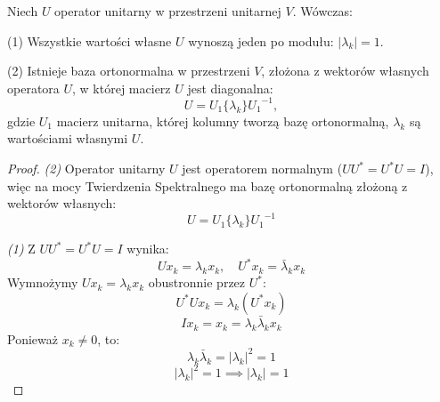 \begin{theorem}\label{theorem:unitary_spectral}
    Niech $U$ operator unitarny w przestrzeni unitarnej $V$.
    Wówczas:

    (1) Wszystkie wartości własne $U$ wynoszą jeden po modułu: $|\lambda_k| = 1$.

    (2) Istnieje baza ortonormalna w przestrzeni $V$, złożona z wektorów własnych operatora $U$, w której macierz $U$ jest diagonalna:
    $$U = U_1\{\lambda_k\}{U_1}^{-1},$$
    gdzie $U_1$ macierz unitarna, której kolumny tworzą bazę ortonormalną, $\lambda_k$ są wartościami własnymi $U$.
\end{theorem}
\begin{proof}
\textit{(2)} Operator unitarny $U$ jest operatorem normalnym ($UU^* = U^*U = I$), więc na mocy Twierdzenia Spektralnego ma bazę ortonormalną złożoną z wektorów własnych:
$$U = U_1\{\lambda_k\}{U_1}^{-1}$$

\textit{(1)} Z $UU^* = U^*U = I$ wynika:
$$Ux_k = \lambda_k x_k, \quad U^*x_k = \bar{\lambda}_k x_k$$
Wymnożymy $Ux_k = \lambda_k x_k$ obustronnie przez $U^*$:
$$U^*Ux_k = \lambda_k(U^*x_k)$$
$$Ix_k = x_k = \lambda_k \bar{\lambda}_k x_k$$
Ponieważ $x_k \neq 0$, to:
$$\lambda_k \bar{\lambda}_k = |\lambda_k|^2 = 1$$
$$|\lambda_k|^2 = 1 \implies |\lambda_k| = 1$$
\end{proof}